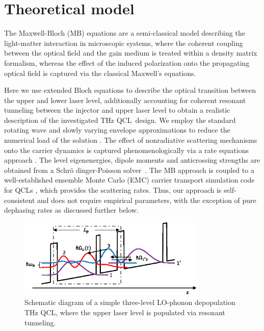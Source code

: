 \documentclass[10pt]{article}
\begin{document}
	\section{Theoretical model}
	\label{sec:thmodel}
	The Maxwell-Bloch (MB) equations are a semi-classical model describing the
	light-matter interaction in microscopic systems, where the coherent coupling
	between the optical field and the gain medium is treated within a density
	matrix formalism, whereas the effect of the induced polarization onto the
	propagating optical field is captured via the classical Maxwell's equations.
	
	Here we use extended Bloch equations to describe the optical transition
	between the upper and lower laser level, additionally accounting for coherent
	resonant tunneling between the injector and upper laser level to obtain a
	realistic description of the investigated THz QCL\ design. We employ the
	standard rotating wave and slowly varying envelope approximations to reduce
	the numerical load of the solution
	\cite{boyd2003nonlinear,wang2007coherent,gordon2008multimode,gkortsas2010dynamics}%
	. The effect of nonradiative scattering mechanisms onto the carrier dynamics
	is captured phenomenologically via a rate equations approach
	\cite{wang2015active,jirauschek2014modeling}. The level eigenenergies, dipole
	moments and anticrossing strengths are obtained from a Schr{\"{o}}%
	dinger-Poisson solver\ \cite{2009IJQE...45..1059J}. The MB approach is coupled
	to a well-established ensemble Monte Carlo (EMC) carrier transport simulation
	code for QCLs
	\cite{jirauschek2007comparative,jirauschek2009monte,jirauschek2010monte, jirauschek2010monte_2},
	which provides the scattering rates. Thus, our approach is self-consistent and
	does not require empirical parameters, with the exception of pure dephasing
	rates as discussed further below. 
	
	\begin{figure}[h!]
		\centering\includegraphics[width=9cm]{TOYMODEL.eps}\caption{Schematic
			diagram of a simple three-level LO-phonon depopulation THz QCL, where the
			upper laser level is populated via resonant tunneling.}%
		\label{fig:img01}%
	\end{figure}
	
\end{document}
